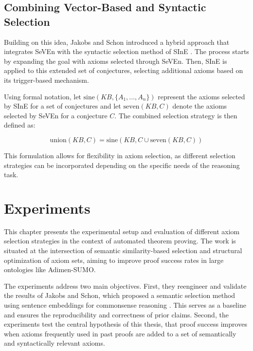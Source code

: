 \documentclass[english,version-2020-11]{uzl-thesis}
\begin{document}
\section{Combining Vector-Based and Syntactic Selection}

Building on this idea, Jakobs and Schon introduced a hybrid approach that integrates SeVEn with the syntactic selection method of SInE \cite{Schon2024}. The process starts by expanding the goal with axioms selected through SeVEn. Then, SInE is applied to this extended set of conjectures, selecting additional axioms based on its trigger-based mechanism. 

Using formal notation, let \( \text{sine}(KB, \{A_1, ..., A_n\}) \) represent the axioms selected by SInE for a set of conjectures and let \( \text{seven}(KB, C) \) denote the axioms selected by SeVEn for a conjecture \( C \). The combined selection strategy is then defined as:

\begin{definition}
    \begin{equation}
        \text{union}(KB, C) = \text{sine}(KB, C \cup \text{seven}(KB, C))
    \end{equation}
\end{definition}

This formulation allows for flexibility in axiom selection, as different selection strategies can be incorporated depending on the specific needs of the reasoning task.


\chapter{Experiments}
\label{chapter-experiments}

This chapter presents the experimental setup and evaluation of different axiom selection strategies in the context of automated theorem proving. The work is situated at the intersection of semantic similarity-based selection and structural optimization of axiom sets, aiming to improve proof success rates in large ontologies like Adimen-SUMO.

The experiments address two main objectives. First, they reengineer and validate the results of Jakobs and Schon, which proposed a semantic selection method using sentence embeddings for commonsense reasoning \cite{Schon2024}. This serves as a baseline and ensures the reproducibility and correctness of prior claims. Second, the experiments test the central hypothesis of this thesis, that proof success improves when axioms frequently used in past proofs are added to a set of semantically and syntactically relevant axioms.
\end{document}
